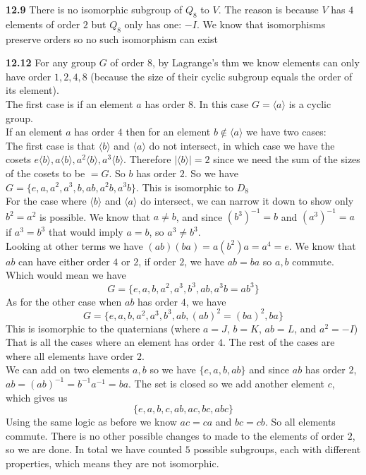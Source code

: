 \documentclass[12pt]{article}
\newenvironment{ques}{\vspace{2 ex}}{\vspace{2 ex}}
\theoremstyle{definition}
\begin{document}
\begin{ques}
	\textbf{12.9} 
		There is no isomorphic subgroup of $Q_8$ to $V$. The reason is
		because $V$ has $4$ elements of order $2$ but $Q_8$ only has
		one: $-I$. We know that isomorphisms preserve orders so no
		such isomorphism can exist
\end{ques}

\begin{ques} 
	\textbf{12.12} 
		For any group $G$ of order $8$, by Lagrange's thm we know
		elements can only have order $1,2,4,8$ (because the size of
		their cyclic subgroup equals the order of its element).\\
		The first case is if an element $a$ has order $8$. In this case
		$G = \langle a \rangle$ is a cyclic group.\\
		If an element $a$ has order $4$ then for an element $b \notin
		\langle a \rangle$ we have two cases:\\ 
		The first case is that $\langle b \rangle$ and $\langle a
		\rangle$ do not intersect, in which case we have the cosets $e
		\langle b \rangle, a \langle b \rangle, a^2 \langle b \rangle,
		a^3 \langle b \rangle$. Therefore $|\langle b \rangle| = 2$
		since we need the sum of the sizes of the cosets to be $= G$.
		So $b$ has order $2$. So we have $G = \{e, a, a^2, a^3, b, ab,
		a^2b, a^3b\}$. This is isomorphic to $D_8$\\
		For the case where $\langle b \rangle$ and $\langle a \rangle$
		do intersect, we can narrow it down to show only $b^2 = a^2$ is
		possible. We know that $a \neq b$, and since $(b^{3})^{-1} = b$
		and $(a^3)^{-1} = a$ if $a^3 = b^3$ that would imply $a = b$,
		so $a^3 \neq b^3$.\\
		Looking at other terms we have $(ab)(ba) = a(b^2)a = a^4 = e$.
		We know that $ab$ can have either order $4$ or $2$, if order
		$2$, we have $ab = ba$ so $a,b$ commute. Which would mean we have
		$$G = \{e, a, b, a^2, a^3, b^3, ab, a^3b = ab^3\}$$
		As for the other case when $ab$ has order $4$, we have 
		$$G = \{e, a, b, a^2, a^3, b^3, ab, (ab)^2 = (ba)^2,  ba\}$$
		This is isomorphic to the quaternians (where $a = J$, $b = K$,
		$ab = L$, and $a^2 = -I$)\\		
		That is all the cases where an element has
		order $4$. The rest of the cases are where all elements have
		order $2$.\\ We can add on two elements $a, b$ so we have $\{e,
		a, b, ab\}$ and since $ab$ has order $2$, $ab = (ab)^{-1} =
		b^{-1}a^{-1} = ba$. The set is closed so we add another element
		$c$, which gives us
		$$\{e, a, b, c, ab, ac, bc, abc\}$$
		Using the same logic as before we know $ac = ca$ and $bc = cb$.
		So all elements commute. There is no other possible changes to
		made to the elements of order $2$, so we are done. In total we
		have counted $5$ possible subgroups, each with different
		properties, which means they are not isomorphic.

\end{ques}
\end{document}
